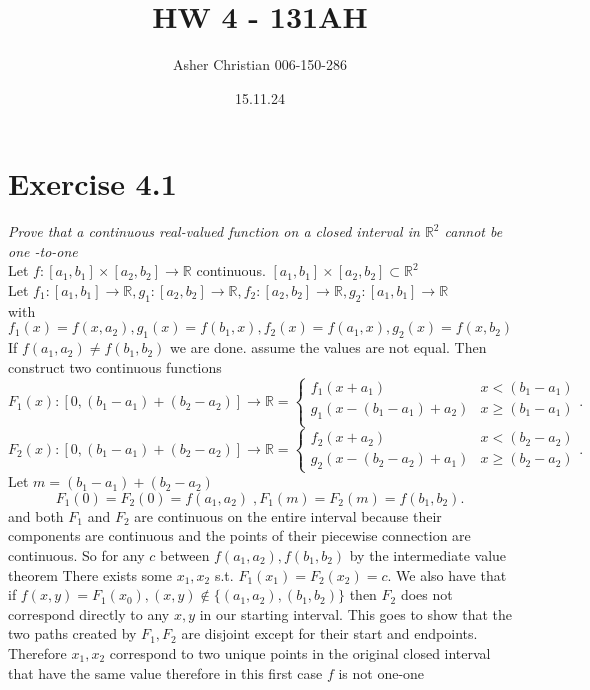 \documentclass{amsart}
\title{HW 4 - 131AH}
\author{Asher Christian 006-150-286}
\date{15.11.24}
\begin{document}
    \maketitle
    \section{Exercise 4.1}
    \emph{Prove that a continuous real-valued function on a closed interval in $ \mathbb{R} ^2$ cannot be one
    -to-one}\\
    Let $f: [a_1,b_1] \times [a_2,b_2] \rightarrow \mathbb{R} $ continuous. $[a_1,b_1] \times [a_2,b_2] \subset \mathbb{R} ^2$\\
    Let $f_1: [a_1,b_1] \rightarrow \mathbb{R}, g_1: [a_2,b_2] \rightarrow \mathbb{R}, f_2: [a_2,b_2] \rightarrow \mathbb{R}, g_2: [a_1,b_1] \rightarrow \mathbb{R}  $\\
    with $f_1(x) = f(x,a_2), g_1(x) = f(b_1,x), f_2(x) = f(a_1,x), g_2(x) = f(x,b_2)$\\
    If $f(a_1,a_2) \ne f(b_1,b_2)$ we are done. assume the values are not equal.
    Then construct two continuous functions
    \[
        F_1(x): [0,(b_1-a_1)+(b_2-a_2)] \rightarrow \mathbb{R}  = 
        \begin{cases}
            f_1(x+a_1) & x < (b_1-a_1)\\
            g_1(x-(b_1-a_1) + a_2) & x \ge (b_1-a_1)\\
        \end{cases}
        .\]
        \[
        F_2(x): [0,(b_1-a_1)+(b_2-a_2)] \rightarrow \mathbb{R}  =
        \begin{cases}
            f_2(x+a_2) & x < (b_2-a_2)\\
            g_2(x-(b_2-a_2)+ a_1) & x \ge (b_2-a_2)
        \end{cases}
    .\] 
    Let $m = (b_1-a_1) + (b_2-a_2)$
    \[
    F_1(0) = F_2(0) = f(a_1,a_2) \; , F_1(m) = F_2(m) = f(b_1,b_2)
    .\] 
    and both  $F_1$ and $F_2$ are continuous on the entire interval because their components are continuous and 
    the points of their piecewise connection are continuous. So for any $c$ between $f(a_1,a_2), f(b_1,b_2)$ by the intermediate value theorem
    There exists some $x_1,x_2$ s.t. $F_1(x_1) = F_2(x_2) = c$. We also have that if $f(x,y) = F_1(x_0), (x,y) \not\in \{(a_1,a_2),(b_1,b_2)\}$ then $F_2$ does not correspond directly to any $x,y$ in our starting interval.
    This goes to show that the two paths created by $F_1, F_2$ are disjoint except for their start and endpoints.
    Therefore $x_1,x_2$ correspond to two unique points in the original closed interval that have the same value therefore in this first case $f$ is not one-one\\
\end{document}
